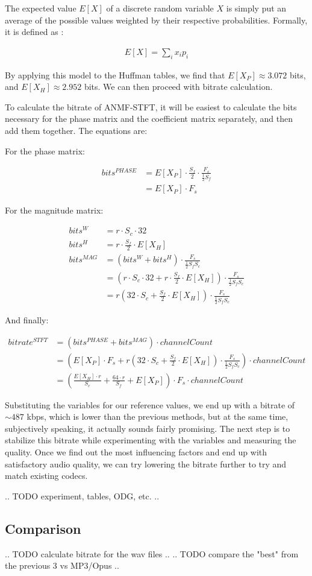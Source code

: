 The expected value $E[X]$ of a discrete random variable $X$ is simply put an average of the possible values weighted by their respective probabilities. Formally, it is defined as \cite{Ross1972IntroductionTP}:

\begin{align}
E[X] = \sum_{i}x_ip_i
\end{align}

By applying this model to the Huffman tables, we find that $E[X_P] \approx 3.072$ bits, and $E[X_H] \approx 2.952$ bits. We can then proceed with bitrate calculation.

To calculate the bitrate of ANMF-STFT, it will be easiest to calculate the bits necessary for the phase matrix and the coefficient matrix separately, and then add them together. The equations are:

For the phase matrix:

\begin{align}
bits^{PHASE}
&= E[X_P] \cdot \frac{S_f}{2} \cdot \frac{F_s}{\frac12 S_f} \\
&= E[X_P] \cdot F_s
\end{align}

For the magnitude matrix:

\begin{align}
bits^W &= r \cdot S_c \cdot 32 \\
bits^H &= r \cdot \frac{S_f}{2} \cdot E[X_H] \\
bits^{MAG} &= (bits^W + bits^H) \cdot \frac{F_s}{\frac12 S_fS_c} \\
&= \left( r \cdot S_c \cdot 32 + r \cdot \frac{S_f}{2} \cdot E[X_H] \right) \cdot \frac{F_s}{\frac12 S_fS_c} \\
&= r(32 \cdot S_c + \frac{S_f}{2} \cdot E[X_H]) \cdot \frac{F_s}{\frac12 S_fS_c}
\end{align}

And finally:

\begin{align}
bitrate^{STFT} &= (bits^{PHASE} + bits^{MAG}) \cdot channelCount \\
&= (E[X_P] \cdot F_s + r(32 \cdot S_c + \frac{S_f}{2} \cdot E[X_H]) \cdot \frac{F_s}{\frac12 S_fS_c}) \cdot channelCount \\
&= \left( \frac{E[X_H] \cdot r}{S_c} + \frac{64 \cdot r}{S_f} + E[X_P] \right) \cdot F_s \cdot channelCount
\end{align}

Substituting the variables for our reference values, we end up with a bitrate of $\sim 487$ kbps, which is lower than the previous methods, but at the same time, subjectively speaking, it actually sounds fairly promising. The next step is to stabilize this bitrate while experimenting with the variables and measuring the quality. Once we find out the most influencing factors and end up with satisfactory audio quality, we can try lowering the bitrate further to try and match existing codecs.

.. TODO experiment, tables, ODG, etc. ..

\subsection{Comparison}
.. TODO calculate bitrate for the wav files ..
.. TODO compare the "best" from the previous 3 vs MP3/Opus ..

